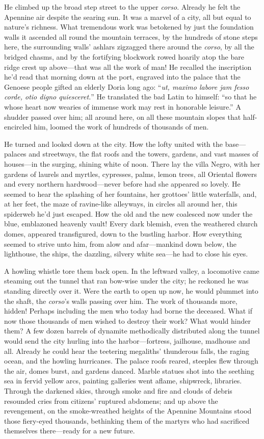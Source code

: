 \documentclass[12pt,a4paper]{article}
\begin{document}
He climbed up the broad step street to the upper \textit{corso}. Already he felt the Apennine air despite the searing sun. It was a marvel of a city, all but equal to nature’s richness. What tremendous work was betokened by just the foundation walls it ascended all round the mountain terraces, by the hundreds of stone steps here, the surrounding walls’ ashlars zigzagged there around the \textit{corso}, by all the bridged chasms, and by the fortifying blockwork rowed hoarily atop the bare ridge crest up above—that was all the work of man! He recalled the inscription he’d read that morning down at the port, engraved into the palace that the Genoese people gifted an elderly Doria long ago: “\textit{ut, maximo labore jam fesso corde, otio digno quiesceret.}” He translated the bad Latin to himself: “so that he whose heart now wearies of immense work may rest in honorable leisure.” A shudder passed over him; all around here, on all these mountain slopes that half-encircled him, loomed the work of hundreds of thousands of men.

He turned and looked down at the city. How the lofty united with the base—palaces and streetways, the flat roofs and the towers, gardens, and vast masses of houses—in the surging, shining white of noon. There lay the villa Negro, with her gardens of laurels and myrtles, cypresses, palms, lemon trees, all Oriental flowers and every northern hardwood—never before had she appeared so lovely. He seemed to hear the splashing of her fountains, her grottoes’ little waterfalls, and, at her feet, the maze of ravine-like alleyways, in circles all around her, this spiderweb he’d just escaped. How the old and the new coalesced now under the blue, emblazoned heavenly vault! Every dark blemish, even the weathered church domes, appeared transfigured, down to the bustling harbor. How everything seemed to strive unto him, from alow and afar—mankind down below, the lighthouse, the ships, the dazzling, silvery white sea—he had to close his eyes.

A howling whistle tore them back open. In the leftward valley, a locomotive came steaming out the tunnel that ran bow-wise under the city; he reckoned he was standing directly over it. Were the earth to open up now, he would plummet into the shaft, the \textit{corso}’s walls passing over him. The work of thousands more, hidden! Perhaps including the men who today had borne the deceased. What if now those thousands of men wished to destroy their work? What would hinder them? A few dozen barrels of dynamite methodically distributed along the tunnel would send the city hurling into the harbor—fortress, jailhouse, madhouse and all. Already he could hear the teetering megaliths’ thunderous falls, the raging ocean, and the howling hurricanes. The palace roofs reared, steeples flew through the air, domes burst, and gardens danced. Marble statues shot into the seething sea in fervid yellow arcs, painting galleries went aflame, shipwreck, libraries. Through the darkened skies, through smoke and fire and clouds of debris resounded cries from citizens’ ruptured abdomens; and up above the revengement, on the smoke-wreathed heights of the Apennine Mountains stood those fiery-eyed thousands, bethinking them of the martyrs who had sacrificed themselves there—ready for a new future.
\end{document}
